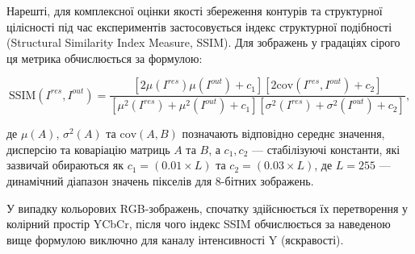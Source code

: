 Нарешті, для комплексної оцінки якості збереження контурів та структурної цілісності під час експериментів застосовується індекс структурної подібності (Structural Similarity Index Measure, SSIM). Для зображень у градаціях сірого ця метрика обчислюється за формулою:

\begin{equation}\tag{26}
	\text{SSIM}(I^{res}, I^{out}) = \frac{[2\mu(I^{res})\mu(I^{out}) + c_1][2\text{cov}(I^{res}, I^{out}) + c_2]}{[\mu^2(I^{res}) + \mu^2(I^{out}) + c_1][\sigma^2(I^{res}) + \sigma^2(I^{out}) + c_2]},
\end{equation}

де $\mu(A)$, $\sigma^2(A)$ та $\text{cov}(A,B)$ позначають відповідно середнє значення, дисперсію та коваріацію матриць $A$ та $B$, а $c_1, c_2$ --- стабілізуючі константи, які зазвичай обираються як $c_1 = (0.01 \times L)$ та $c_2 = (0.03 \times L)$, де $L = 255$ --- динамічний діапазон значень пікселів для 8-бітних зображень. 

У випадку кольорових RGB-зображень, спочатку здійснюється їх перетворення у колірний простір YCbCr, після чого індекс SSIM обчислюється за наведеною вище формулою виключно для каналу інтенсивності Y (яскравості).